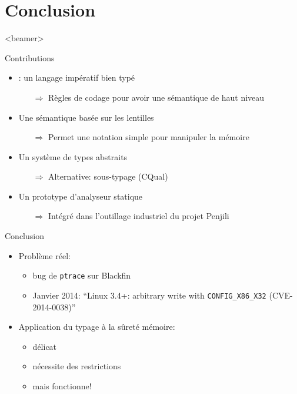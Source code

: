 \section{Conclusion}
  \begin{frame}<beamer>
   \tableofcontents[currentsection]
 \end{frame}


\begin{frame}{Contributions}

\begin{itemize}
\item \langname: un langage impératif bien typé
    \begin{itemize}
        \item[$⇒$] Règles de codage pour avoir une sémantique de haut niveau
    \end{itemize}
\item Une sémantique basée sur les lentilles
    \begin{itemize}
        \item[$⇒$] Permet une notation simple pour manipuler la mémoire
    \end{itemize}
\item Un système de types abstraits
    \begin{itemize}
        \item[$⇒$] Alternative: sous-typage (CQual)
    \end{itemize}
\item Un prototype d'analyseur statique
    \begin{itemize}
        \item[$⇒$] Intégré dans l'outillage industriel du projet Penjili
    \end{itemize}
\end{itemize}
\end{frame}

\begin{frame}{Conclusion}
    \begin{itemize}
    \item Problème réel:
        \begin{itemize}
            \item bug de \texttt{ptrace} sur Blackfin
            \item Janvier 2014:
                \enquote{Linux 3.4+: arbitrary write with \texttt{CONFIG\_X86\_X32} (CVE-2014-0038)}
        \end{itemize}
    \item Application du typage à la sûreté mémoire:
        \begin{itemize}
            \item délicat
            \item nécessite des restrictions
            \item mais fonctionne!
        \end{itemize}
    \end{itemize}
\end{frame}

